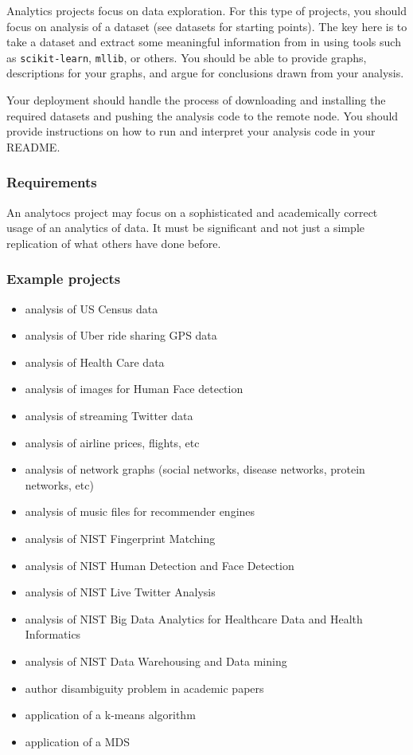 Analytics projects focus on data exploration. For this type of projects,
you should focus on analysis of a dataset (see datasets for starting
points). The key here is to take a dataset and extract some meaningful
information from in using tools such as \texttt{scikit-learn},
\texttt{mllib}, or others. You should be able to provide graphs,
descriptions for your graphs, and argue for conclusions drawn from your
analysis.

Your deployment should handle the process of downloading and installing
the required datasets and pushing the analysis code to the remote node.
You should provide instructions on how to run and interpret your
analysis code in your README.

\subsubsection{Requirements}\label{requirements-1}

An analytocs project may focus on a sophisticated and academically
correct usage of an analytics of data. It must be significant and not
just a simple replication of what others have done before.

\subsubsection{Example projects}\label{example-projects-1}

\begin{itemize}
\tightlist
\item
  analysis of US Census data
\item
  analysis of Uber ride sharing GPS data
\item
  analysis of Health Care data
\item
  analysis of images for Human Face detection
\item
  analysis of streaming Twitter data
\item
  analysis of airline prices, flights, etc
\item
  analysis of network graphs (social networks, disease networks, protein
  networks, etc)
\item
  analysis of music files for recommender engines
\item
  analysis of NIST Fingerprint Matching
\item
  analysis of NIST Human Detection and Face Detection
\item
  analysis of NIST Live Twitter Analysis
\item
  analysis of NIST Big Data Analytics for Healthcare Data and Health
  Informatics
\item
  analysis of NIST Data Warehousing and Data mining
\item
  author disambiguity problem in academic papers
\item
  application of a k-means algorithm
\item
  application of a MDS
\end{itemize}

